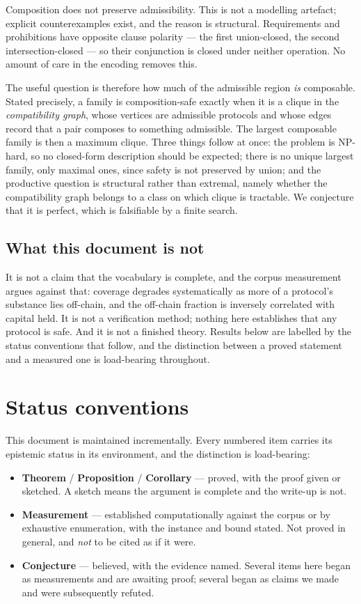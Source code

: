 \documentclass[11pt]{article}
\theoremstyle{definition}
\theoremstyle{plain}
\theoremstyle{remark}
\begin{document}
Composition does not preserve admissibility. This is not a modelling artefact;
explicit counterexamples exist, and the reason is structural. Requirements and
prohibitions have opposite clause polarity --- the first union-closed, the second
intersection-closed --- so their conjunction is closed under neither operation.
No amount of care in the encoding removes this.

The useful question is therefore how much of the admissible region \emph{is}
composable. Stated precisely, a family is composition-safe exactly when it is a
clique in the \emph{compatibility graph}, whose vertices are admissible protocols
and whose edges record that a pair composes to something admissible. The largest
composable family is then a maximum clique. Three things follow at once: the
problem is NP-hard, so no closed-form description should be expected; there is no
unique largest family, only maximal ones, since safety is not preserved by union;
and the productive question is structural rather than extremal, namely whether
the compatibility graph belongs to a class on which clique is tractable. We
conjecture that it is perfect, which is falsifiable by a finite search.

\subsection{What this document is not}

It is not a claim that the vocabulary is complete, and the corpus measurement
argues against that: coverage degrades systematically as more of a protocol's
substance lies off-chain, and the off-chain fraction is inversely correlated with
capital held. It is not a verification method; nothing here establishes that any
protocol is safe. And it is not a finished theory. Results below are labelled by the
status conventions that follow, and the distinction between a proved statement
and a measured one is load-bearing throughout.

\section*{Status conventions}

This document is maintained incrementally. Every numbered item carries its
epistemic status in its environment, and the distinction is load-bearing:

\begin{itemize}
  \item \textbf{Theorem} / \textbf{Proposition} / \textbf{Corollary} --- proved,
    with the proof given or sketched. A sketch means the argument is complete and
    the write-up is not.
  \item \textbf{Measurement} --- established computationally against the corpus
    or by exhaustive enumeration, with the instance and bound stated. Not proved
    in general, and \emph{not} to be cited as if it were.
  \item \textbf{Conjecture} --- believed, with the evidence named. Several items
    here began as measurements and are awaiting proof; several began as claims we
    made and were subsequently refuted.
\end{itemize}
\end{document}
